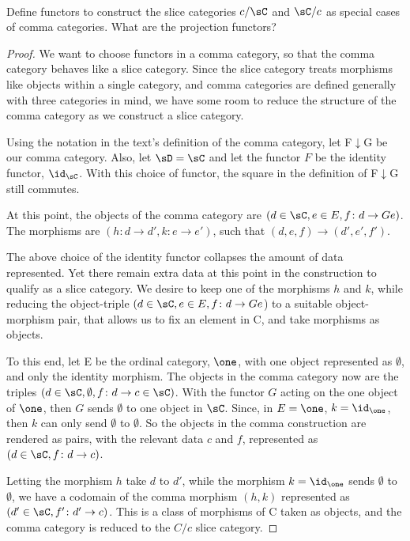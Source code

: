 \documentclass[main.tex]{subfiles}
\begin{document}
\paragraph{}
\begin{exercise}
	Define functors to construct the slice categories $c/\sC$ and $\sC/c$ as special
	cases of comma categories. What are the projection functors?
\end{exercise}

\begin{proof}
	We want to choose functors in a comma category, so that the comma category
	behaves like a slice category. Since the slice category treats morphisms
	like objects within a single category, and comma categories are defined
	generally with three categories in mind, we have some room to reduce the
	structure of the comma category as we construct a slice category.

	Using the notation in the text's definition of the comma category, let
	F$\downarrow$G be our comma category. Also, let $\sD = \sC$ and let the functor
	$F$ be the identity functor, $\id_\sC$. With this choice of functor, the
	square in the definition of F$\downarrow$G still commutes.

	At this point, the objects of the comma category are $(d \in \sC, e\in E, f\colon d
	\rightarrow Ge)$. The morphisms are $(h\colon d\rightarrow d', k\colon e\rightarrow
	e')$, such that $(d,e,f) \rightarrow (d',e',f')$.

	The above choice of the identity functor collapses the amount of data
	represented. Yet there remain extra data at this point in the construction
	to qualify as a slice category. We desire to keep one of the morphisms $h$
	and $k$, while reducing the object-triple $(d \in \sC, e\in E, f\colon d
	\rightarrow Ge$) to a suitable object-morphism pair, that allows us to fix
	an element in C, and take morphisms as objects.

	To this end, let E be the ordinal category, $\one$, with one object
	represented as $\emptyset$, and only the identity morphism. The objects in
	the comma category now are the triples $(d \in \sC, \emptyset, f\colon d
	\rightarrow c \in \sC)$. With the functor $G$ acting on the one object of
	$\one$, then $G$ sends $\emptyset$ to one object in $\sC$. Since, in $E =
	\one$, $k = \id_{\one}$, then $k$ can only send $\emptyset$ to
	$\emptyset$. So the objects in the comma construction are rendered as pairs,
	with the relevant data $c$ and $f$, represented as $(d \in \sC, f\colon d
	\rightarrow c)$.

	Letting the morphism $h$ take $d$ to $d'$, while the morphism $k = \id_{\one}$ sends $\emptyset$ to $\emptyset$, we have a codomain of the comma
	morphism $(h,k)$ represented as $(d' \in \sC, f'\colon d' \rightarrow c)$. This is
	a class of morphisms of C taken as objects, and the comma category is
	reduced to the $C/c$ slice category.
\end{proof}
\end{document}

